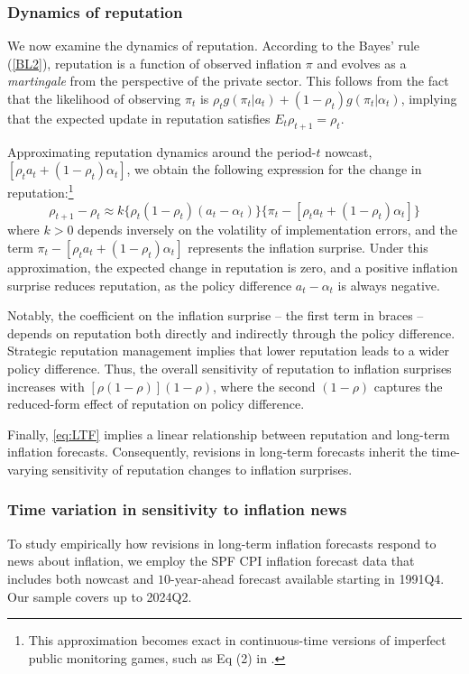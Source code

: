 \documentclass[12pt,letter,leqno]{article}
\theoremstyle{asn}
\theoremstyle{lem}
\theoremstyle{slem}
\theoremstyle{prop}
\theoremstyle{appprop}
\theoremstyle{rem}
\theoremstyle{defn}
\begin{document}
\subsubsection{Dynamics of reputation}
We now examine the dynamics of reputation. According to the Bayes' rule (\ref{BL2}), reputation is a function of observed inflation $\pi$ and evolves as a \textit{martingale} from the perspective of the private sector. This follows from the fact that the likelihood of observing $\pi_t$ is $\rho_t g(\pi_t | a_t) + (1 - \rho_t) g(\pi_t | \alpha_t)$, implying that the expected update in reputation satisfies $E_t \rho_{t+1} = \rho_t$.

Approximating reputation dynamics around the period-$t$ nowcast, $[\rho_t a_t + (1 - \rho_t) \alpha_t]$, we obtain the following expression for the change in reputation:\footnote{This approximation becomes exact in continuous-time versions of imperfect public monitoring games, such as Eq (2) in \cite{faingold_reputation_2011}.}
\begin{equation}\label{eq:rhoapprox}
\rho_{t+1} - \rho_t \approx k \{\rho_t(1 - \rho_t)(a_t - \alpha_t)\}  \{\pi_t - [\rho_t a_t + (1 - \rho_t) \alpha_t]\}
\end{equation}
where $k > 0$ depends inversely on the volatility of implementation errors, and the term $\pi_t - [\rho_t a_t + (1 - \rho_t) \alpha_t]$ represents the inflation surprise. Under this approximation, the expected change in reputation is zero, and a positive inflation surprise reduces reputation, as the policy difference $a_t - \alpha_t$ is always negative.

Notably, the coefficient on the inflation surprise -- the first term in braces -- depends on reputation both directly and indirectly through the policy difference. Strategic reputation management implies that lower reputation leads to a wider policy difference. Thus, the overall sensitivity of reputation to inflation surprises increases with $[\rho(1 - \rho)](1 - \rho)$, where the second $(1 - \rho)$ captures the reduced-form effect of reputation on policy difference.

Finally, \eqref{eq:LTF} implies a linear relationship between reputation and long-term inflation forecasts. Consequently, revisions in long-term forecasts inherit the time-varying sensitivity of reputation changes to inflation surprises.



\subsubsection{Time variation in sensitivity to inflation news}
To study empirically how revisions in long-term inflation forecasts respond to news about inflation, we employ the SPF CPI inflation forecast data that includes both nowcast and $10$-year-ahead forecast available starting in 1991Q4. Our sample covers up to 2024Q2.
\end{document}
